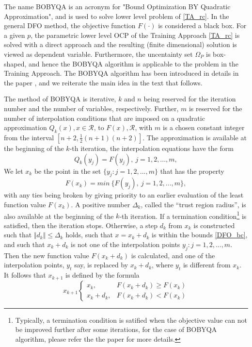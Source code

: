 The name BOBYQA is an acronym for "Bound Optimization BY Quadratic Approximation", and is used to solve lower level problem of \ref{TA_rc}. In the general DFO method, the objective function $F(\cdot)$ is considered a black box. For a given $p$, the parametric lower level OCP of the Training Approach \ref{TA_rc} is solved with a direct approach and the resulting (finite dimensional) solution is viewed as dependent variable. Furthermore, the uncentainty set $\Omega_P$ is box-shaped, and hence the BOBYQA algorithm is applicable to the problem in the Training Approach. The BOBYQA algorithm has been introduced in details in the paper \cite{MicPow09}, and we reiterate the main idea in the text that follows.  

The method of BOBYQA is iterative, $k$ and $n$ being reserved for the iteration number and the number of variables, respectively. Further, $m$ is reserved for the number of interpolation conditions that are imposed on a quadratic approximation $Q_k(x), x \in \mathcal{R}$, to $F(x), \mathcal{R}$, with $m$ is a chosen constant  integer from the interval $[n+2, \frac{1}{2}(n+1)(n+2)]$. The approximation is available at the beginning of the $k$-th iteration, the interpolation equations have the form
\begin{equation}
  Q_k(y_j)= F(y_j),\   j = 1, 2, ..., m, 
\end{equation}
We let $x_k$ be the point in the set $\{y_j : j = 1, 2, ... , m\}$ that has the property
\begin{equation}
	F(x_k)= min\ \{F(y_j), \  j = 1, 2, ..., m\}, 
\end{equation}
with any ties being broken by giving priority to an earlier evaluation of the least function value $F(x_k)$. A positive number $\Delta_k$, called the “trust region radius”, is also available at the beginning of the $k$-th iteration. If a termination condition\footnote{Typically, a termination condition is satified when the objective value can not be improved further after some iterations, for the case of BOBYQA algorithm, please refer the the paper \cite{MicPow09} for more details.} is satisfied, then the iteration stops. Otherwise, a step $d_k$ from $x_k$ is constructed such 
that $ \Vert d_k \Vert \leq \Delta_k $ holds, such that $x = x_k+d_k$ is within the bounds \ref{DFO_bc}, and such that $x_k+d_k$ is not one of the interpolation points $y_j : j = 1, 2, ... , m$. Then the new function value $F(x_k+d_k)$ is calculated, and one of the interpolation points, $y_t$ say, is replaced by $x_k+d_k$, where $y_t$ is different from $x_k$. It follows that $x_{k+1}$ is defined by the formula
\begin{equation}
	x_{k+1}
	\begin{cases}
		 x_k, & F(x_k+d_k) \geq F(x_k) \\
		x_k+d_k  , & F(x_k+d_k) < F(x_k) 
	\end{cases}
\end{equation}

